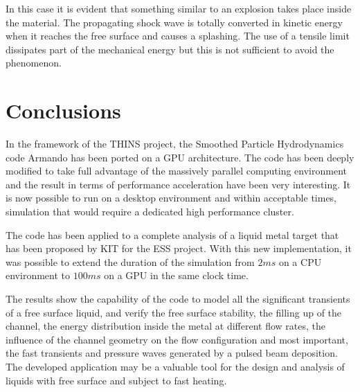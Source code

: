 \documentclass[a4paper, 11pt, twocolumn]{article}
\begin{document}
In this case it is evident that something similar to  an explosion takes place inside the material. The propagating shock wave is totally converted in kinetic energy when it reaches the free surface and causes a splashing. The use of a tensile limit dissipates part of the mechanical energy but this is not sufficient to avoid the phenomenon.




\section{Conclusions}
In the framework of the THINS project, the Smoothed Particle Hydrodynamics code Armando has been ported on a GPU architecture. The code has been deeply modified to take full advantage of the massively parallel computing environment and the result in terms of performance acceleration have been very interesting. It is now possible to run on a desktop environment and within acceptable times, simulation that would require a dedicated high performance cluster. 

The code has been applied to a complete analysis of a liquid metal target that has been proposed by KIT for the ESS project. With this new implementation, it was possible to extend the duration of the simulation from $2ms$ on a CPU environment to $100ms$ on a GPU in the same clock time.

The results show the capability of the code to model all the significant transients of a free surface liquid, and verify the free surface stability, the filling up of the channel, the energy distribution inside the metal at different flow rates, the influence of the channel geometry on the flow configuration and most important, the fast transients and pressure waves generated by a pulsed beam deposition. The developed application may be a valuable tool for the design and analysis of liquids with free surface and subject to fast heating.
\end{document}

